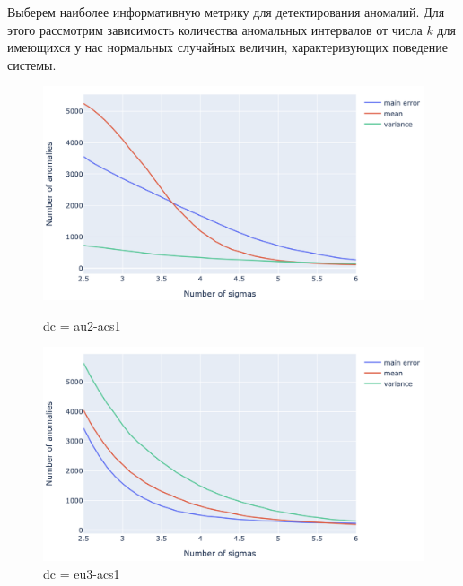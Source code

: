 \documentclass[14pt, a4paper]{extarticle}
\begin{document}
	Выберем наиболее информативную метрику для детектирования аномалий. Для этого рассмотрим зависимость количества аномальных интервалов от числа $k$ для имеющихся у нас нормальных случайных величин, характеризующих поведение системы. 
	\begin{figure}[!htb]
		\includegraphics[width=\linewidth]{figures/modes_au2_acs1.png}
		\caption{dc = au2-acs1}
		\endminipage\hfill
		\includegraphics[width=\linewidth]{figures/modes_eu3_acs1.png}
		\caption{dc = eu3-acs1}
		\endminipage
	

\end{figure}
\end{document}
